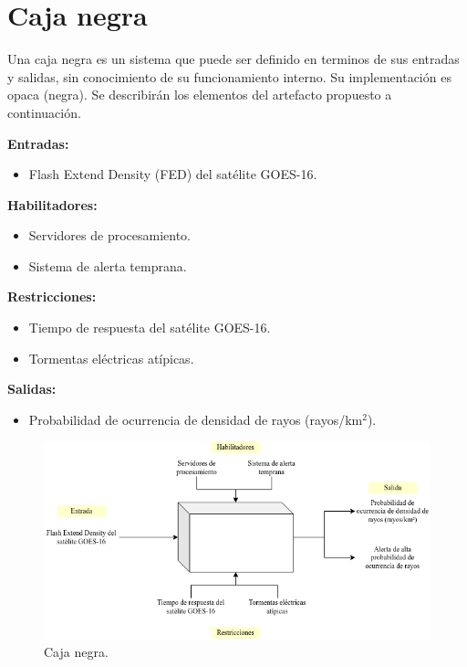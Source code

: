 \section{Caja negra}
Una caja negra es un sistema que puede ser definido en terminos de sus entradas 
y salidas, sin conocimiento de su funcionamiento interno. Su implementación es 
opaca (negra). Se describirán los elementos del artefacto propuesto a 
continuación.

\textbf{Entradas:}
\begin{itemize}
  \item Flash Extend Density (FED) del satélite GOES-16.
\end{itemize}

\textbf{Habilitadores:}
\begin{itemize}
  \item Servidores de procesamiento.
  \item Sistema de alerta temprana.
\end{itemize}

\textbf{Restricciones:}
\begin{itemize}
  \item Tiempo de respuesta del satélite GOES-16.
  \item Tormentas eléctricas atípicas.
\end{itemize}


\textbf{Salidas:}
\begin{itemize}
  \item Probabilidad de ocurrencia de densidad de rayos (rayos/km$^2$).
\end{itemize}

\begin{figure}[H]
  \centering
  \includegraphics[width=14cm]{E_IMAGENES/4_Aporte/CajaNegra}
  \caption{
    Caja negra.
  }
  \label{fig:cajanegra}
\end{figure}